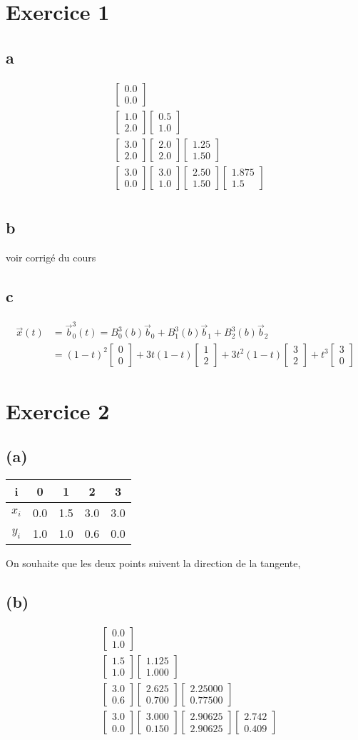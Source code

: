 \documentclass[11pt,a4paper]{report}
\newcommand{\matv}[2]{\begin{bmatrix}#1 \\ #2 \end{bmatrix}}
\begin{document}
\section{Exercice 1}
\subsection{a}
\begin{align*}
&\matv{0.0}{0.0} \\
&\matv{1.0}{2.0} \matv{0.5}{1.0}\\
&\matv{3.0}{2.0} \matv{2.0}{2.0} \matv{1.25}{1.50}\\
&\matv{3.0}{0.0} \matv{3.0}{1.0} \matv{2.50}{1.50} \matv{1.875}{1.5}\\
\end{align*}
\subsection{b}
voir corrigé du cours
\subsection{c}
\begin{align*}
\vec{x}(t) &= \vec{b}_0^3(t) = B_0^3(b)\vec{b}_0 + B_1^3(b)\vec{b}_1 + B_2^3(b)\vec{b}_2 \\
           &= (1-t)^2 \matv{0}{0} + 3t(1-t) \matv{1}{2} + 3t^2(1-t)\matv{3}{2} + t^3\matv{3}{0}
\end{align*}
\section{Exercice 2}
\subsection*{(a)}
\begin{center}
\begin{tabular}{|c|c|c|c|c|}
\hline 
i & 0 & 1 & 2 & 3 \\ \hline\hline 
$x_i$ & 0.0 & 1.5 & 3.0 & 3.0 \\ \hline 
$y_i$ & 1.0 & 1.0 & 0.6 & 0.0 \\ \hline 
\end{tabular}
\end{center}

On souhaite que les deux points suivent la direction de la tangente, 
\subsection*{(b)}
\begin{align*}
& \matv{0.0}{1.0} \\
& \matv{1.5}{1.0} \matv{1.125}{1.000} \\
& \matv{3.0}{0.6} \matv{2.625}{0.700} \matv{2.25000}{0.77500} \\
& \matv{3.0}{0.0} \matv{3.000}{0.150} \matv{2.90625}{2.90625} \matv{2.742}{0.409} \\
\end{align*}
\end{document}
